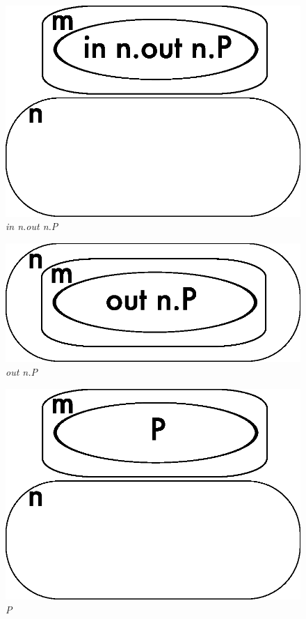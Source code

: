 \begin{figure}  
  \centering
  \includegraphics{ambient1}
  \caption{\textit{in n.out n.P}}
  \label{fig:ambient1}
\end{figure}

\begin{figure}  
  \centering
  \includegraphics{ambient2}
  \caption{\textit{out n.P}}
  \label{fig:ambient2}
\end{figure}

\begin{figure}  
  \centering
  \includegraphics{ambient3}
  \caption{\textit{P}}
  \label{fig:ambient3}
\end{figure}

